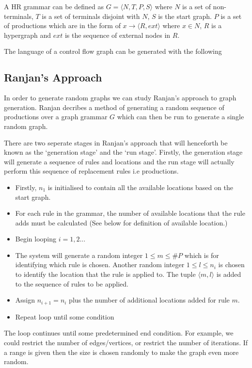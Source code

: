     A HR grammar can be defined as $G = \langle N, T, P, S \rangle$ where $N$ is a set of non-terminals, $T$ is a set of terminals disjoint with $N$, $S$ is the start graph. $P$ is a set of productions which are in the form of $x \to \langle R, ext \rangle$ where $x \in N$, $R$ is a hypergraph and $ext$ is the sequence of external nodes in $R$.

    The language of a control flow graph can be generated with the following
    

\subsection{Ranjan's Approach}
  In order to generate random graphs we can study Ranjan's approach to graph generation. Ranjan\cite{Ranjan} decribes a method of generating a random sequence of productions over a graph grammar $G$ which can then be run to generate a single random graph.

  There are two seperate stages in Ranjan's approach that will henceforth be known as the `generation stage' and the `run stage'. Firstly, the generation stage will generate a sequence of rules and locations and the run stage will actually perform this sequence of replacement rules i.e productions.

  \begin{itemize}
  \item Firstly, $n_1$ is initialised to contain all the available locations based on the start graph.
  \item For each rule in the grammar, the number of available locations that the rule adds must be calculated (See below for definition of available location.)
  \item Begin looping $i = 1,2...$
  \item The system will generate a random integer $1 \leq m \leq \#P$ which is for identifying which rule is chosen. Another random integer $1 \leq l \leq n_i$ is chosen to identify the location that the rule is applied to. The tuple $\langle m,l \rangle$ is added to the sequence of rules to be applied.
  \item Assign $n_{i+1} = n_i$ plus the number of additional locations added for rule $m$. 
  \item Repeat loop until some condition
  \end{itemize}

  The loop continues until some predetermined end condition. For example, we could restrict the number of edges/vertices, or restrict the number of iterations. If a range is given then the size is chosen randomly to make the graph even more random.

